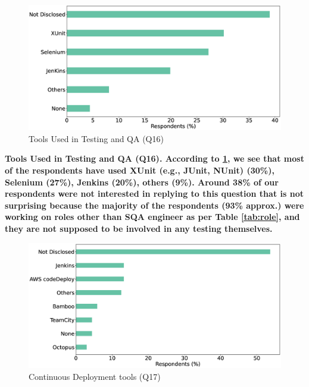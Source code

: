 \begin{figure}[h]
\centering
  \includegraphics[scale=0.18]{Figures/Respondents_testing_tools}
  \caption{Tools Used in Testing and QA (Q16)}
  \label{fig:testingTools}
\end{figure}
\bf{Tools Used in Testing and QA (Q16).} According to \ref{fig:testingTools}, we see that most of the
respondents have used XUnit (e.g., JUnit, NUnit) (30\%), Selenium (27\%),
Jenkins (20\%), others (9\%). Around
38\% of our respondents were not interested in replying to this question that is
not surprising because the majority of the respondents (93\% approx.) were
working on roles other than SQA engineer as per Table \ref{tab:role}, and they
are not supposed to be involved in any testing themselves. 


\begin{figure}[h]
\centering
  \includegraphics[scale=0.18]{Figures/Respondents_deployment_tools}
  \caption{Continuous Deployment tools (Q17)}
  \label{fig:deployTools}
\end{figure}

